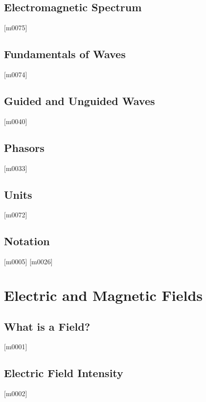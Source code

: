 \documentclass[10pt,letterpaper,twocolumn,openany]{book}
\theoremstyle{definition} %
\begin{document}
    \section{Electromagnetic Spectrum}
{\color{blue}\tiny[m0075]}      
      \vfill\break
    \section{Fundamentals of Waves}
{\color{blue}\tiny[m0074]}      
      \vfill\break
    \section{Guided and Unguided Waves}
{\color{blue}\tiny[m0040]}      
      \vfill\break
    \section{Phasors}
{\color{blue}\tiny[m0033]}      
      \vfill\break
    \section{Units}
{\color{blue}\tiny[m0072]}      
      \vfill\break
    \section{Notation}
{\color{blue}\tiny[m0005]}      
{\color{blue}\tiny[m0026]}    
  \chapter{Electric and Magnetic Fields}
  \thispagestyle{fancy} %
  \fancyhf{}            %
    \section{What is a Field?}
{\color{blue}\tiny[m0001]}      
      \vfill\break
    \section{Electric Field Intensity}
{\color{blue}\tiny[m0002]}      
      \vfill\break
\end{document}

